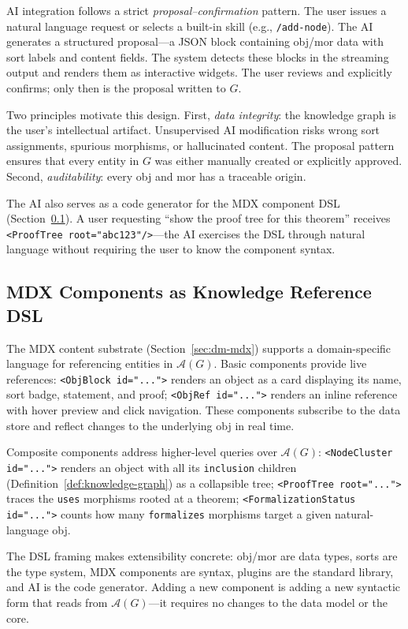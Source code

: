 AI integration follows a strict \emph{proposal--confirmation} pattern. The user issues a natural language request or selects a built-in skill (e.g., \texttt{/add-node}). The AI generates a structured proposal---a JSON block containing obj/mor data with sort labels and content fields. The system detects these blocks in the streaming output and renders them as interactive widgets. The user reviews and explicitly confirms; only then is the proposal written to $G$.

Two principles motivate this design. First, \emph{data integrity}: the knowledge graph is the user's intellectual artifact. Unsupervised AI modification risks wrong sort assignments, spurious morphisms, or hallucinated content. The proposal pattern ensures that every entity in $G$ was either manually created or explicitly approved. Second, \emph{auditability}: every obj and mor has a traceable origin.

The AI also serves as a code generator for the MDX component DSL (Section~\ref{sec:sys-dsl}). A user requesting ``show the proof tree for this theorem'' receives \texttt{<ProofTree root="abc123"/>}---the AI exercises the DSL through natural language without requiring the user to know the component syntax.


\subsection{MDX Components as Knowledge Reference DSL}
\label{sec:sys-dsl}

The MDX content substrate (Section~\ref{sec:dm-mdx}) supports a domain-specific language for referencing entities in $\mathcal{A}(G)$. Basic components provide live references: \texttt{<ObjBlock id="...">} renders an object as a card displaying its name, sort badge, statement, and proof; \texttt{<ObjRef id="...">} renders an inline reference with hover preview and click navigation. These components subscribe to the data store and reflect changes to the underlying obj in real time.

Composite components address higher-level queries over $\mathcal{A}(G)$: \texttt{<NodeCluster id="...">} renders an object with all its \texttt{inclusion} children (Definition~\ref{def:knowledge-graph}) as a collapsible tree; \texttt{<ProofTree root="...">} traces the \texttt{uses} morphisms rooted at a theorem; \texttt{<FormalizationStatus id="...">} counts how many \texttt{formalizes} morphisms target a given natural-language obj.

The DSL framing makes extensibility concrete: obj/mor are data types, sorts are the type system, MDX components are syntax, plugins are the standard library, and AI is the code generator. Adding a new component is adding a new syntactic form that reads from $\mathcal{A}(G)$---it requires no changes to the data model or the core.
